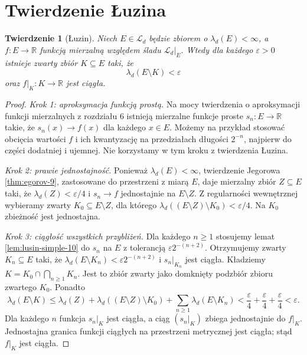 \documentclass[11pt,a4paper,oneside]{book}
\numberwithin{equation}{chapter}
\theoremstyle{plain}
\newtheorem{twierdzenie}{Twierdzenie}[chapter]
\theoremstyle{definition}
\theoremstyle{remark}
\begin{document}
\section{Twierdzenie Łuzina}

\begin{twierdzenie}[Łuzin]
\label{thm:lusin-10}
Niech $E\in\mathcal L_d$ będzie zbiorem o
$\lambda_d(E)<\infty$, a $f:E\to\mathbb R$
funkcją mierzalną względem śladu
$\mathcal L_d|_E$. Wtedy dla każdego
$\varepsilon>0$ istnieje zwarty zbiór
$K\subseteq E$ taki, że
\begin{equation}\label{eq:lusin-measure-10}
\lambda_d(E\setminus K)<\varepsilon
\end{equation}
oraz $f|_K:K\to\mathbb R$ jest ciągła.
\end{twierdzenie}
\begin{proof}
\textit{Krok 1: aproksymacja funkcją prostą.}
Na mocy twierdzenia o aproksymacji funkcji
mierzalnych z rozdziału 6 istnieją mierzalne
funkcje proste $s_n:E\to\mathbb R$ takie, że
$s_n(x)\to f(x)$ dla każdego $x\in E$.
Możemy na przykład stosować obcięcia wartości
$f$ i ich kwantyzację na przedziałach długości
$2^{-n}$, najpierw do części dodatniej i ujemnej.
Nie korzystamy w tym kroku z twierdzenia Łuzina.

\textit{Krok 2: prawie jednostajność.}
Ponieważ $\lambda_d(E)<\infty$, twierdzenie
Jegorowa \ref{thm:egorov-9}, zastosowane do
przestrzeni z miarą $E$, daje mierzalny zbiór
$Z\subseteq E$ taki, że
$\lambda_d(Z)<\varepsilon/4$ i $s_n\to f$
jednostajnie na $E\setminus Z$.
Z regularności wewnętrznej wybieramy zwarty
$K_0\subseteq E\setminus Z$, dla którego
$\lambda_d((E\setminus Z)\setminus K_0)<\varepsilon/4$.
Na $K_0$ zbieżność jest jednostajna.

\textit{Krok 3: ciągłość wszystkich przybliżeń.}
Dla każdego $n\ge1$ stosujemy lemat
\ref{lem:lusin-simple-10} do $s_n$ na $E$
z tolerancją $\varepsilon 2^{-(n+2)}$.
Otrzymujemy zwarty $K_n\subseteq E$ taki, że
$\lambda_d(E\setminus K_n)<
\varepsilon2^{-(n+2)}$ i $s_n|_{K_n}$ jest ciągła.
Kładziemy
$K=K_0\cap\bigcap_{n\ge1}K_n$.
Jest to zbiór zwarty jako domknięty podzbiór
zbioru zwartego $K_0$. Ponadto
\[
\lambda_d(E\setminus K)
\le\lambda_d(Z)+
\lambda_d((E\setminus Z)\setminus K_0)+
\sum_{n\ge1}\lambda_d(E\setminus K_n)
<\frac\varepsilon4+\frac\varepsilon4+
\frac\varepsilon4<\varepsilon.
\]
Dla każdego $n$ funkcja $s_n|_K$ jest ciągła,
a ciąg $(s_n|_K)$ zbiega jednostajnie do $f|_K$.
Jednostajna granica funkcji ciągłych na przestrzeni
metrycznej jest ciągła; stąd $f|_K$ jest ciągła.
\end{proof}
\end{document}
